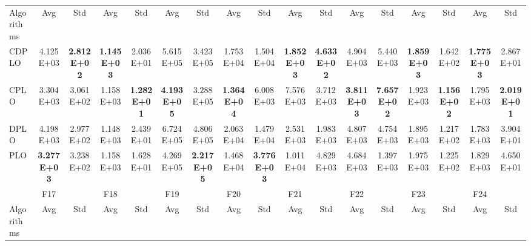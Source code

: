 \documentclass[review]{elsarticle}
\begin{document}
\begin{table}
\begin{tabular}{@{} lcccccccccccccccc @{}}
Algorithms & Avg                & Std                & Avg                & Std                & Avg                & Std                & Avg                & Std                & Avg                & Std                & Avg                  & Std                 & Avg                & Std                & Avg                & Std                \\
CDPLO      & 4.125E+03          & \textbf{2.812E+02} & \textbf{1.145E+03} & 2.036E+01          & 5.615E+05          & 3.423E+05          & 1.753E+04          & 1.504E+04          & \textbf{1.852E+03} & \textbf{4.633E+02} & 4.904E+03            & 5.440E+03           & \textbf{1.859E+03} & 1.642E+02          & \textbf{1.775E+03} & 2.867E+01          \\
CPLO       & 3.304E+03          & 3.061E+02          & 1.158E+03          & \textbf{1.282E+01} & \textbf{4.193E+05} & 3.288E+05          & \textbf{1.364E+04} & 6.008E+03          & 7.576E+03          & 3.712E+03          & \textbf{3.811E+03}   & \textbf{7.657E+02}  & 1.923E+03          & \textbf{1.156E+02} & 1.795E+03          & \textbf{2.019E+01} \\
DPLO       & 4.198E+03          & 2.977E+02          & 1.148E+03          & 2.439E+01          & 6.724E+05          & 4.806E+05          & 2.063E+04          & 1.479E+04          & 2.531E+03          & 1.983E+03          & 4.807E+03            & 4.754E+03           & 1.895E+03          & 1.217E+02          & 1.783E+03          & 3.904E+01          \\
PLO        & \textbf{3.277E+03} & 3.238E+02          & 1.158E+03          & 1.628E+01          & 4.269E+05          & \textbf{2.217E+05} & 1.468E+04          & \textbf{3.776E+03} & 1.011E+04          & 4.829E+03          & 4.684E+03            & 1.397E+03           & 1.975E+03          & 1.225E+02          & 1.829E+03          & 4.650E+01          \\
           & F17                &                    & F18                &                    & F19                &                    & F20                &                    & F21                &                    & F22                  &                     & F23                &                    & F24                &                    \\
Algorithms & Avg                & Std                & Avg                & Std                & Avg                & Std                & Avg                & Std                & Avg                & Std                & Avg                  & Std                 & Avg                & Std                & Avg                & Std                \\

\end{tabular}
\end{table}
\end{document}
